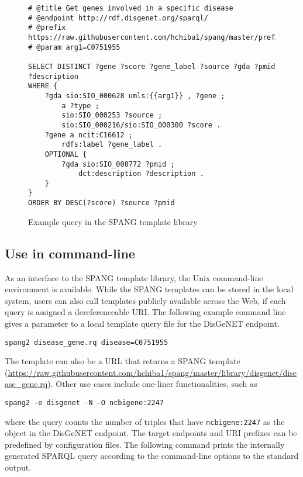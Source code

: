 \documentclass[runningheads]{llncs}
\begin{document}
\begin{figure}[!t]
\begin{scriptsize}
\begin{verbatim}
# @title Get genes involved in a specific disease
# @endpoint http://rdf.disgenet.org/sparql/
# @prefix https://raw.githubusercontent.com/hchiba1/spang/master/prefix/bio
# @param arg1=C0751955 

SELECT DISTINCT ?gene ?score ?gene_label ?source ?gda ?pmid ?description
WHERE {
    ?gda sio:SIO_000628 umls:{{arg1}} , ?gene ;
        a ?type ;
        sio:SIO_000253 ?source ;
        sio:SIO_000216/sio:SIO_000300 ?score .
    ?gene a ncit:C16612 ;
        rdfs:label ?gene_label .
    OPTIONAL {
        ?gda sio:SIO_000772 ?pmid ;
            dct:description ?description .
    }
}
ORDER BY DESC(?score) ?source ?pmid

\end{verbatim}
\end{scriptsize}
\caption{Example query in the SPANG template library}
\label{fig:example-sparql}
\end{figure}


\subsection{Use in command-line}

As an interface to the SPANG template library, the Unix command-line environment is available.
While the SPANG templates can be stored in the local system, users can also call templates publicly available across the Web, if each query is assigned a dereferenceable URI.
The following example command line gives a parameter to a local template query file for the DisGeNET endpoint.

\texttt{spang2 disease\_gene.rq disease=C0751955}

\noindent The template can also be a URL that returns a SPANG template (\url{https://raw.githubusercontent.com/hchiba1/spang/master/library/disgenet/disease_gene.rq}). Other use cases include one-liner functionalities, such as

\texttt{spang2 -e disgenet -N -O ncbigene:2247}

\noindent where the query counts the number of triples that have \texttt{ncbigene:2247} as the object in the DisGeNET endpoint. The target endpoints and URI prefixes can be predefined by configuration files. The following command prints the internally generated SPARQL query according to the command-line options to the standard output. 
\end{document}
